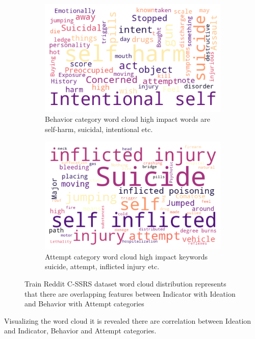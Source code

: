 \documentclass[sn-mathphys,Numbered]{sn-jnl}%
\theoremstyle{thmstyleone}%
\theoremstyle{thmstyletwo}%
\theoremstyle{thmstylethree}%
\begin{document}
\begin{figure}[h!]
\begin{subfigure}{0.45\textwidth}
\end{subfigure}      
\centering
\begin{subfigure}{0.45\textwidth}
    \includegraphics[width=\textwidth]{Behavior_word_cloud.png}
    \caption{Behavior category word cloud high impact words are self-harm, suicidal, intentional etc.}
    \label{redditdist}
\end{subfigure}
\hfill
\begin{subfigure}{0.45\textwidth}
    \includegraphics[width=\textwidth]{Attempt_word_cloud.png}
    \caption{Attempt category word cloud high impact keywords suicide, attempt, inflicted injury etc.}
    \label{twitterdist}
\end{subfigure}   
\caption{Train Reddit C-SSRS dataset word cloud distribution represents that there are overlapping features between Indicator with Ideation and Behavior with Attempt categories}
\label{redditdist_twitterdist_wordcloud}
\end{figure}
Visualizing the word cloud it is revealed there are correlation between Ideation and Indicator, Behavior and Attempt categories.  
\end{document}
